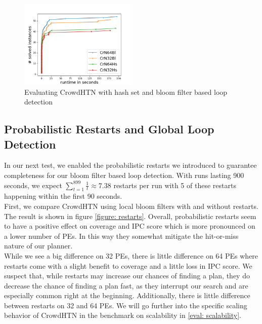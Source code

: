 \begin{figure}[!hbp]
	\caption{Evaluating CrowdHTN with hash set and bloom filter based loop detection}
	\label{figure: eval loop detection}
	
		\centering
		\includegraphics[width=0.5\textwidth]{images/final/loop_detection}
	
\end{figure}

\subsection{Probabilistic Restarts and Global Loop Detection}
\label{eval: restarts}
In our next test, we enabled the probabilistic restarts we introduced to guarantee completeness for our bloom filter based loop detection. With runs lasting 900 seconds, we expect $\sum_{t=1}^{899} \frac{1}{t} \approx 7.38$ restarts per run with 5 of these restarts happening within the first 90 seconds. \\
First, we compare CrowdHTN using local bloom filters with and without restarts. The result is shown in figure \ref{figure: restarts}. Overall, probabilistic restarts seem to have a positive effect on coverage and IPC score which is more pronounced on a lower number of PEs. In this way they somewhat mitigate the hit-or-miss nature of our planner. \\
While we see a big difference on 32 PEs, there is little difference on 64 PEs where restarts come with a slight benefit to coverage and a little loss in IPC score. We suspect that, while restarts may increase our chances of finding a plan, they do decrease the chance of finding a plan fast, as they interrupt our search and are especially common right at the beginning. Additionally, there is little difference between restarts on 32 and 64 PEs. We will go further into the specific scaling behavior of CrowdHTN in the benchmark on scalability in \ref{eval: scalability}. \\

